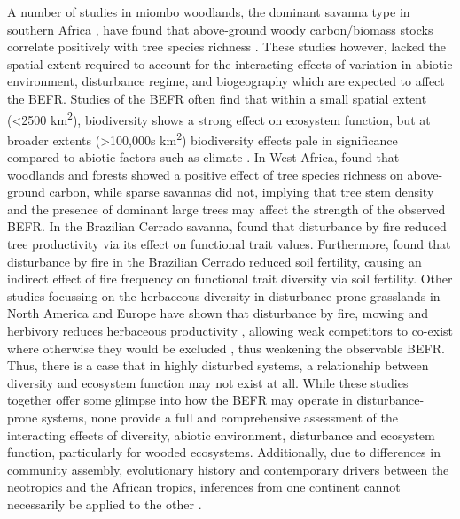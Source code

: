 \begin{refsection}
A number of studies in miombo woodlands, the dominant savanna type in southern Africa \citep{Campbell1996}, have found that above-ground woody carbon/biomass stocks correlate positively with tree species richness \citep{McNicol2018a, Shirima2015b, Mutowo2012}. These studies however, lacked the spatial extent required to account for the interacting effects of variation in abiotic environment, disturbance regime, and biogeography which are expected to affect the BEFR. Studies of the BEFR often find that within a small spatial extent (<2500 km\textsuperscript{2}), biodiversity shows a strong effect on ecosystem function, but at broader extents (>100,000s km\textsuperscript{2}) biodiversity effects pale in significance compared to abiotic factors such as climate \citep{Gonzalez2020}. In West Africa, \citet{Mensah2020} found that woodlands and forests showed a positive effect of tree species richness on above-ground carbon, while sparse savannas did not, implying that tree stem density and the presence of dominant large trees may affect the strength of the observed BEFR. In the Brazilian Cerrado savanna, \citet{Loiola2015} found that disturbance by fire reduced tree productivity via its effect on functional trait values. Furthermore, \citet{Carvalho2014} found that disturbance by fire in the Brazilian Cerrado reduced soil fertility, causing an indirect effect of fire frequency on functional trait diversity via soil fertility. Other studies focussing on the herbaceous diversity in disturbance-prone grasslands in North America and Europe have shown that disturbance by fire, mowing and herbivory reduces herbaceous productivity \citep{Grace2007}, allowing weak competitors to co-exist where otherwise they would be excluded \citep{Mason2011}, thus weakening the observable BEFR. Thus, there is a case that in highly disturbed systems, a relationship between diversity and ecosystem function may not exist at all. While these studies together offer some glimpse into how the BEFR may operate in disturbance-prone systems, none provide a full and comprehensive assessment of the interacting effects of diversity, abiotic environment, disturbance and ecosystem function, particularly for wooded ecosystems. Additionally, due to differences in community assembly, evolutionary history and contemporary drivers between the neotropics and the African tropics, inferences from one continent cannot necessarily be applied to the other \citep{Dexter2015}.


\end{refsection}
